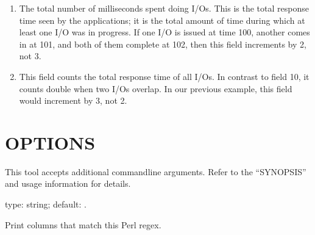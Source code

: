 \documentclass[letterpaper,10pt,english]{sphinxmanual}
\begin{document}
\begin{enumerate}
\item {} 
\sphinxAtStartPar
The total number of milliseconds spent doing I/Os.  This is  the total
response time seen by the applications; it is the total amount of time during
which at least one I/O was in progress.  If one I/O is issued at time 100,
another comes in at 101, and both of them complete at 102, then this field
increments by 2, not 3.

\item {} 
\sphinxAtStartPar
This field counts the total response time of all I/Os.  In contrast to field 10,
it counts double when two I/Os overlap.  In our previous example, this field
would increment by 3, not 2.

\end{enumerate}


\section{OPTIONS}
\label{\detokenize{mariadb-iostat:options}}
\sphinxAtStartPar
This tool accepts additional command\sphinxhyphen{}line arguments.  Refer to the
“SYNOPSIS” and usage information for details.

\begin{fulllineitems}
\label{\detokenize{mariadb-iostat:cmdoption-mariadb-iostat-columns-regex}}
\sphinxAtStartPar
type: string; default: .

\sphinxAtStartPar
Print columns that match this Perl regex.

\end{fulllineitems}

\end{document}
